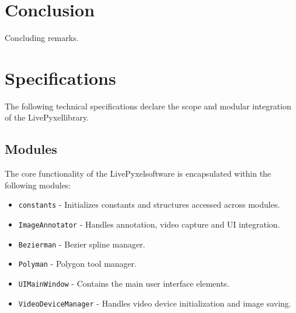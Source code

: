 \documentclass{article}
\newcommand{\progname}{LivePyxel}
\begin{document}
\section{Conclusion}
Concluding remarks.

\section{Specifications}
The following technical specifications declare the scope and modular integration of the \progname library.

\subsection{Modules}
The core functionality of the \progname software is encapsulated within the following modules:
\begin{itemize}
    \item \texttt{constants} - Initializes constants and structures accessed across modules.
    \item \texttt{ImageAnnotator} - Handles annotation, video capture and UI integration.
    \item \texttt{Bezierman} - Bezier spline manager.
    \item \texttt{Polyman} - Polygon tool manager.
    \item \texttt{UIMainWindow} - Contains the main user interface elements.
    \item \texttt{VideoDeviceManager} - Handles video device initialization and image saving.
\end{itemize}
\end{document}
